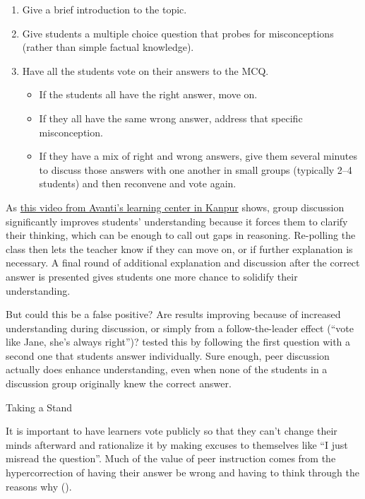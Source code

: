 \begin{enumerate}

  \item
    Give a brief introduction to the topic.

  \item
    Give students a multiple choice question that probes for
    misconceptions (rather than simple factual knowledge).

  \item
    Have all the students vote on their answers to the MCQ.

    \begin{itemize}
      \item
        If the students all have the right answer, move on.
      \item
        If they all have the same wrong answer, address that specific
        misconception.
      \item
        If they have a mix of right and wrong answers, give them
        several minutes to discuss those answers with one another in
        small groups (typically 2--4 students) and then reconvene and
        vote again.
  \end{itemize}

\end{enumerate}

As \href{https://www.youtube.com/watch?v=2LbuoxAy56o}{this video from
  Avanti's learning center in Kanpur} shows, group discussion
significantly improves students' understanding because it forces them
to clarify their thinking, which can be enough to call out gaps in
reasoning. Re-polling the class then lets the teacher know if they can
move on, or if further explanation is necessary. A final round of
additional explanation and discussion after the correct answer is
presented gives students one more chance to solidify their
understanding.

But could this be a false positive? Are results improving because of
increased understanding during discussion, or simply from a
follow-the-leader effect (``vote like Jane, she's always right'')?
\cite{Smit2009} tested this by following the first question with a
second one that students answer individually.  Sure enough, peer
discussion actually does enhance understanding, even when none of the
students in a discussion group originally knew the correct answer.

\begin{callout}{Taking a Stand}

  It is important to have learners vote publicly so that they can't
  change their minds afterward and rationalize it by making excuses to
  themselves like ``I just misread the question''. Much of the value
  of peer instruction comes from the hypercorrection of having their
  answer be wrong and having to think through the reasons why
  ().

\end{callout}

